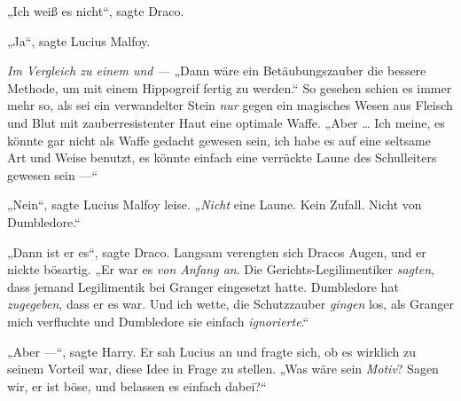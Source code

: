 „Ich weiß es nicht“, sagte Draco.

„Ja“, sagte Lucius Malfoy.

\emph{Im Vergleich zu einem  und  —}
„Dann wäre ein Betäubungszauber die bessere Methode, um mit einem Hippogreif fertig zu werden.“
So gesehen schien es immer mehr so, als sei ein verwandelter Stein \emph{nur} gegen ein magisches Wesen aus Fleisch und Blut mit zauberresistenter Haut eine optimale Waffe.
„Aber … Ich meine, es könnte gar nicht als Waffe gedacht gewesen sein, ich habe es auf eine seltsame Art und Weise benutzt, es könnte einfach eine verrückte Laune des Schulleiters gewesen sein —“

„Nein“, sagte Lucius Malfoy leise.
„\emph{Nicht} eine Laune. Kein Zufall. Nicht von Dumbledore.“

„Dann ist er es“, sagte Draco.
Langsam verengten sich Dracos Augen, und er nickte bösartig.
„Er war es \emph{von Anfang an}. Die Gerichts-Legilimentiker \emph{sagten}, dass jemand Legilimentik bei Granger eingesetzt hatte. Dumbledore hat \emph{zugegeben}, dass er es war. Und ich wette, die Schutzzauber \emph{gingen} los, als Granger mich verfluchte und Dumbledore sie einfach \emph{ignorierte}.“

„Aber —“, sagte Harry. Er sah Lucius an und fragte sich, ob es wirklich zu seinem Vorteil war, diese Idee in Frage zu stellen.
„Was wäre sein \emph{Motiv}? Sagen wir, er ist böse, und belassen es einfach dabei?“

